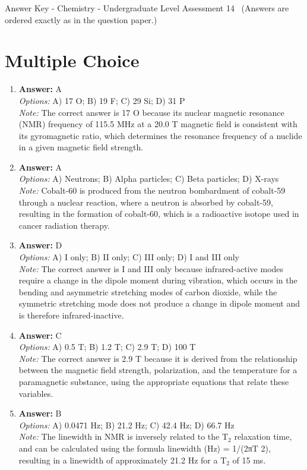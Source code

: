 \documentclass[12pt]{article}
\begin{document}
\begin{center}
Answer Key - Chemistry - Undergraduate Level Assessment 14 \
\small (Answers are ordered exactly as in the question paper.)
\end{center}

\section*{Multiple Choice}
\begin{enumerate}[label=\arabic*.]
\item \textbf{Answer:} A
\\ \textit{Options:} A) 17 O; B) 19 F; C) 29 Si; D) 31 P
\\ \textit{Note:} The correct answer is 17 O because its nuclear magnetic resonance (NMR) frequency of 115.5 MHz at a 20.0 T magnetic field is consistent with its gyromagnetic ratio, which determines the resonance frequency of a nuclide in a given magnetic field strength.
\item \textbf{Answer:} A
\\ \textit{Options:} A) Neutrons; B) Alpha particles; C) Beta particles; D) X-rays
\\ \textit{Note:} Cobalt-60 is produced from the neutron bombardment of cobalt-59 through a nuclear reaction, where a neutron is absorbed by cobalt-59, resulting in the formation of cobalt-60, which is a radioactive isotope used in cancer radiation therapy.
\item \textbf{Answer:} D
\\ \textit{Options:} A) I only; B) II only; C) III only; D) I and III only
\\ \textit{Note:} The correct answer is I and III only because infrared-active modes require a change in the dipole moment during vibration, which occurs in the bending and asymmetric stretching modes of carbon dioxide, while the symmetric stretching mode does not produce a change in dipole moment and is therefore infrared-inactive.
\item \textbf{Answer:} C
\\ \textit{Options:} A) 0.5 T; B) 1.2 T; C) 2.9 T; D) 100 T
\\ \textit{Note:} The correct answer is 2.9 T because it is derived from the relationship between the magnetic field strength, polarization, and the temperature for a paramagnetic substance, using the appropriate equations that relate these variables.
\item \textbf{Answer:} B
\\ \textit{Options:} A) 0.0471 Hz; B) 21.2 Hz; C) 42.4 Hz; D) 66.7 Hz
\\ \textit{Note:} The linewidth in NMR is inversely related to the T$_{2}$ relaxation time, and can be calculated using the formula linewidth (Hz) = 1/(2πT 2), resulting in a linewidth of approximately 21.2 Hz for a T$_{2}$ of 15 ms.
\end{enumerate}
\end{document}
